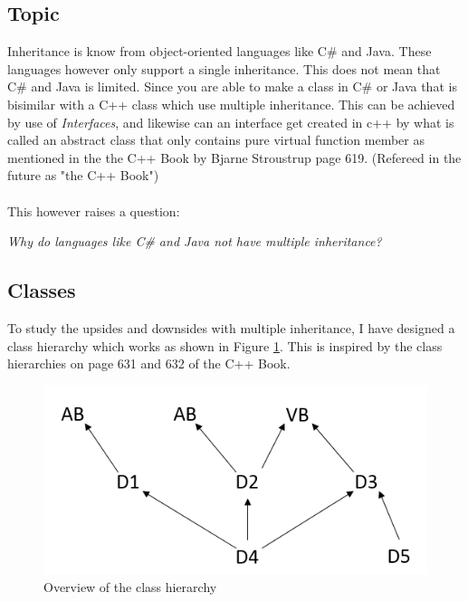 \subsection{Topic}
Inheritance is know from object-oriented languages like C\# \cite{CSharpIn} and Java\cite{JavaIn}. 
These languages however only support a single inheritance.
This does not mean that C\# and Java is limited. 
Since you are able to make a class in C\# or Java that is bisimilar with a C++ class which use multiple inheritance.
This can be achieved by use of \textit{Interfaces}, and likewise can an interface get created in c++ by what is called an abstract class that only contains pure virtual function member as mentioned in the the C++ Book by Bjarne Stroustrup page 619.\cite{CplusplusBook} (Refereed in the future as "the C++ Book")\\\\
This however raises a question: 
\begin{center}
\textit{Why do languages like C\# and Java not have multiple inheritance?}
\end{center}

\subsection{Classes}
To study the upsides and downsides with multiple inheritance, I have designed a class hierarchy which works as shown in Figure \ref{classHierarchy}. 
This is inspired by the class hierarchies on page 631 and 632 of the C++ Book.
\begin{figure}[H]      
\centering
\includegraphics[scale=0.3]{grafik/classH}
\caption{Overview of the class hierarchy}
\label{classHierarchy}
\end{figure}

